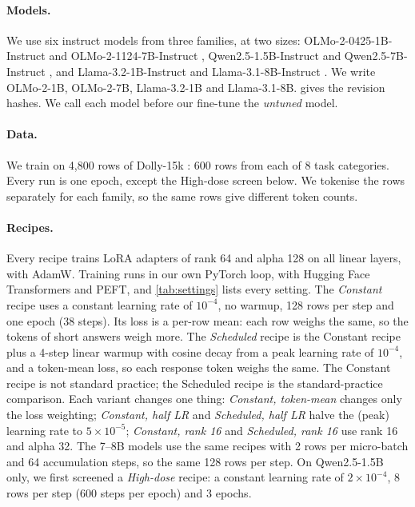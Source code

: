 \documentclass{article}
\begin{document}
\paragraph{Models.} We use six instruct models from three families, at two
sizes: OLMo-2-0425-1B-Instruct and OLMo-2-1124-7B-Instruct
\citep{olmo2024olmo2}, Qwen2.5-1.5B-Instruct and Qwen2.5-7B-Instruct
\citep{qwen2024qwen25}, and Llama-3.2-1B-Instruct and Llama-3.1-8B-Instruct
\citep{grattafiori2024llama}. We write OLMo-2-1B, OLMo-2-7B, Llama-3.2-1B and
Llama-3.1-8B.  gives the revision hashes. We call each model
before our fine-tune the \emph{untuned} model.

\paragraph{Data.} We train on 4,800 rows of Dolly-15k
\citep{conover2023dolly}: 600 rows from each of 8 task categories. Every run is
one epoch, except the High-dose screen below. We tokenise the rows separately
for each family, so the same rows give different token counts.

\paragraph{Recipes.} Every recipe trains LoRA adapters \citep{hu2022lora} of
rank 64 and alpha 128 on all linear layers, with AdamW. Training runs in our
own PyTorch loop, with Hugging Face Transformers and PEFT, and
\cref{tab:settings} lists every setting. The \emph{Constant}
recipe uses a constant learning rate of $10^{-4}$, no warmup, 128 rows per step
and one epoch (38 steps). Its loss is a per-row mean: each row weighs the same,
so the tokens of short answers weigh more. The \emph{Scheduled} recipe is the
Constant recipe plus a 4-step linear warmup with cosine decay from a peak
learning rate of $10^{-4}$, and a token-mean loss, so each response token
weighs the same. The Constant recipe is not standard practice; the Scheduled
recipe is the standard-practice comparison. Each variant changes one thing:
\emph{Constant, token-mean} changes only the loss weighting; \emph{Constant,
half LR} and \emph{Scheduled, half LR} halve the (peak) learning rate to
$5 \times 10^{-5}$; \emph{Constant, rank 16} and \emph{Scheduled, rank 16} use
rank 16 and alpha 32. The 7--8B models use the same recipes with 2 rows per
micro-batch and 64 accumulation steps, so the same 128 rows per step. On
Qwen2.5-1.5B only, we first screened a \emph{High-dose} recipe: a constant
learning rate of $2 \times 10^{-4}$, 8 rows per step (600 steps per epoch) and
3 epochs.
\end{document}
